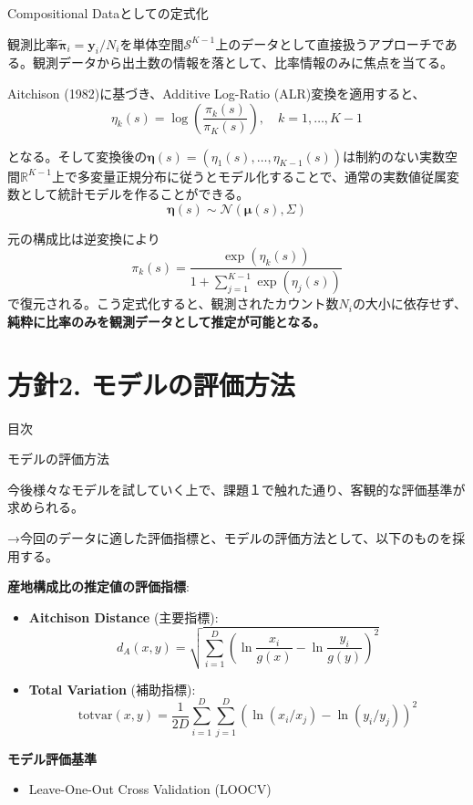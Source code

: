 \documentclass[xelatex, 8pt]{beamer}
\theoremstyle{plain}
\theoremstyle{definition}
\begin{document}
\begin{frame}{Compositional Dataとしての定式化}

観測比率$\tilde{\boldsymbol{\pi}}_i = \mathbf{y}_i/N_i$を単体空間$\mathcal{S}^{K-1}$上のデータとして直接扱うアプローチである。観測データから出土数の情報を落として、比率情報のみに焦点を当てる。

Aitchison (1982)\cite{Aitchison1982-yc}に基づき、Additive Log-Ratio (ALR)変換を適用すると、
$$\eta_k(s) = \log\left(\frac{\pi_k(s)}{\pi_K(s)}\right), \quad k = 1, \ldots, K-1$$

となる。そして変換後の$\boldsymbol{\eta}(s) = (\eta_1(s), \ldots, \eta_{K-1}(s))$は制約のない実数空間$\mathbb{R}^{K-1}$上で多変量正規分布に従うとモデル化することで、通常の実数値従属変数として統計モデルを作ることができる。
$$\boldsymbol{\eta}(s) \sim \mathcal{N}(\boldsymbol{\mu}(s), \Sigma)$$

元の構成比は逆変換により
$$\pi_k(s) = \frac{\exp(\eta_k(s))}{1 + \sum_{j=1}^{K-1} \exp(\eta_j(s))}$$
で復元される。こう定式化すると、観測されたカウント数$N_i$の大小に依存せず、\textbf{純粋に比率のみを観測データとして推定が可能となる。}

\end{frame}
\section{方針2. モデルの評価方法}

\begin{frame}
{\Large 目次}
 \tableofcontents[currentsection]
\end{frame}

\begin{frame}{モデルの評価方法}

今後様々なモデルを試していく上で、課題１で触れた通り、客観的な評価基準が求められる。

\vspace{3mm}
→今回のデータに適した評価指標と、モデルの評価方法として、以下のものを採用する。

\vspace{2mm}
\textbf{産地構成比の推定値の評価指標}:
    \begin{itemize}
        \item \textbf{Aitchison Distance} (主要指標):
        $$d_A(x,y) = \sqrt{\sum_{i=1}^{D} \left(\ln\frac{x_i}{g(x)} - \ln\frac{y_i}{g(y)}\right)^2}$$
        \item \textbf{Total Variation} (補助指標):
        $$\text{totvar}(x,y) = \frac{1}{2D}\sum_{i=1}^{D}\sum_{j=1}^{D}(\ln(x_i/x_j) - \ln(y_i/y_j))^2$$
    \end{itemize}

\textbf{モデル評価基準}
\begin{itemize}
    \item Leave-One-Out Cross Validation (LOOCV)
\end{itemize}

\end{frame}
\end{document}
